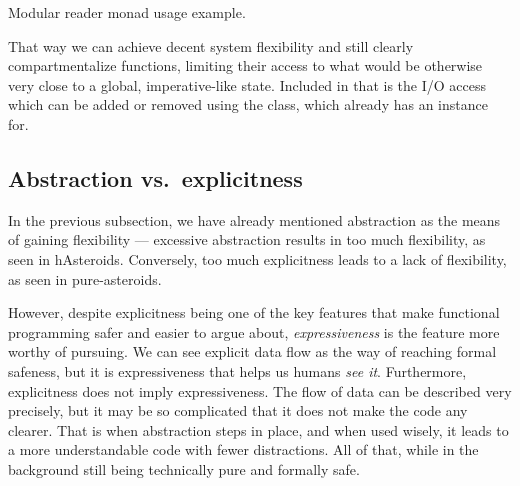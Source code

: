 \documentclass[
  digital, %
  color,   %
  table,   %
  oneside, %
  lof,     %
  lot,     %
]{fithesis3}
\newcommand{\vs}{vs.\ }
\begin{document}
{\begin{listing}
\caption{Modular reader monad usage example.}
\label{lst:usedream}
\end{listing}

That way we can achieve decent system flexibility and still clearly compartmentalize
functions, limiting their access to what would be otherwise very close to a global,
imperative-like state. Included in that is the  I/O access which can be added or removed
using the  class, which  already has an instance for.




\subsection{Abstraction \vs explicitness}

In the previous subsection, we have already mentioned abstraction as the means
of gaining flexibility --- excessive abstraction results in too much flexibility,
as seen in hAsteroids. Conversely, too much explicitness leads to a lack of flexibility,
as seen in pure-asteroids.

However, despite explicitness being one of the key features that make functional
programming safer and easier to argue about, \emph{expressiveness} is the feature
more worthy of pursuing. We can see explicit data flow as the way of reaching
formal safeness, but it is expressiveness that helps us humans \emph{see it}.
Furthermore, explicitness does not imply expressiveness. The flow of data can be
described very precisely, but it may be so complicated that it does not make the code any clearer.
That is when abstraction steps in place, and when used wisely, it leads to a
more understandable code with fewer distractions. All of that, while in the background
still being technically pure and formally safe.

}
\end{document}
